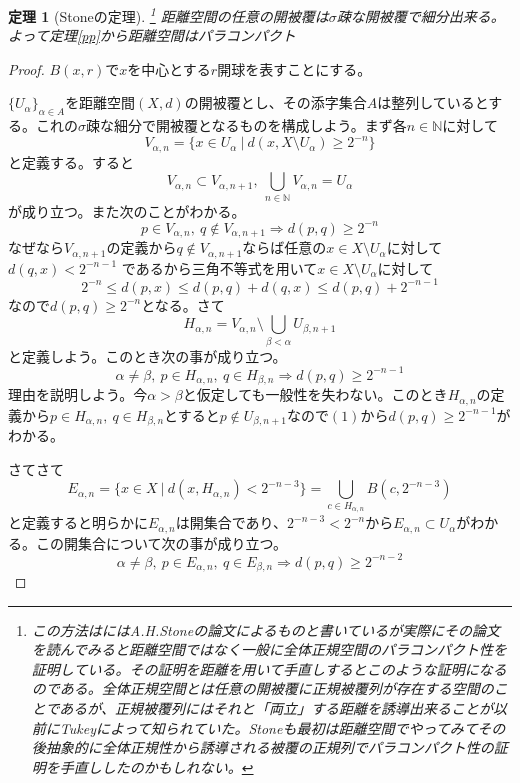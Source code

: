 \documentclass[leqno]{jsarticle}
\newtheorem{thm}{定理}
\newcommand{\To}{\Longrightarrow}
\newcommand{\nn}{\mathbb{N}}
\newcommand{\al}{\alpha}
\newcommand{\be}{\beta}
\begin{document}
\begin{thm}[Stoneの定理]\footnote{この方法は\cite{bi}にはA.H.Stoneの論文\cite{stone}によるものと書いているが実際にその論文を読んでみると距離空間ではなく一般に全体正規空間のパラコンパクト性を証明している。その証明を距離を用いて手直しするとこのような証明になるのである。全体正規空間とは任意の開被覆に正規被覆列が存在する空間のことであるが、正規被覆列にはそれと「両立」する距離を誘導出来ることが\cite{stone}以前にTukeyによって知られていた。Stoneも最初は距離空間でやってみてその後抽象的に全体正規性から誘導される被覆の正規列でパラコンパクト性の証明を手直ししたのかもしれない。}
距離空間の任意の開被覆は$\sigma$疎な開被覆で細分出来る。よって定理\ref{pp}から距離空間はパラコンパクト
\end{thm}
\begin{proof}$B(x,r)$で$x$を中心とする$r$開球を表すことにする。\par
$\{U_{\alpha}\}_{\alpha \in A}$を距離空間$(X,d)$の開被覆とし、その添字集合$A$は整列しているとする。これの$\sigma$疎な細分で開被覆となるものを構成しよう。まず各$n\in \nn$に対して
\[
V_{\al,n}=\{x\in U_{\al}\ |\ d(x,X\setminus U_{\al})\ge 2^{-n}\}
\]
と定義する。すると
\[
V_{\al,n}\subset V_{\al,n+1},\ \bigcup_{n\in \nn}V_{\al,n}=U_{\al}
\]
が成り立つ。また次のことがわかる。
\begin{equation}
p\in V_{\al,n},\ q\not\in V_{\al,n+1}\To d(p,q)\ge2^{-n}
\end{equation}
なぜなら$V_{\al,n+1}$の定義から$q\not\in V_{\al,n+1}$ならば任意の$x\in X\setminus U_{\al}$に対して$d(q,x)<2^{-n-1}$
であるから三角不等式を用いて$x\in X\setminus U_{\al}$に対して
\[
2^{-n}\le d(p,x)\le d(p,q)+d(q,x)\le d(p,q)+2^{-n-1}
\]
なので$d(p,q)\ge2^{-n}$となる。さて
\[
H_{\al,n}=V_{\al,n}\setminus\bigcup_{\be<\al}U_{\be,n+1}
\]
と定義しよう。このとき次の事が成り立つ。
\begin{equation}
\al\neq\be,\ p\in H_{\al,n},\ q\in H_{\be,n}\To d(p,q)\ge 2^{-n-1} 
\end{equation}
理由を説明しよう。今$\al>\be$と仮定しても一般性を失わない。このとき$H_{\al,n}$の定義から$p\in H_{\al,n},\ q\in H_{\be,n}$とすると$p\not\in U_{\be,n+1}$なので$(1)$から$d(p,q)\ge2^{-n-1}$がわかる。\par
さてさて
\[
E_{\al,n}=\{x\in X\ |\ d(x,H_{\al,n})<2^{-n-3}\}=\bigcup_{c\in H_{\al,n}}B(c,2^{-n-3})
\]
と定義すると明らかに$E_{\al,n}$は開集合であり、$2^{-n-3}<2^{-n}$から$E_{\al,n}\subset U_{\al}$がわかる。この開集合について次の事が成り立つ。
\begin{equation}
\al\neq\be,\ p\in E_{\al,n},\ q\in E_{\be,n}\To d(p,q)\ge 2^{-n-2} 

\end{equation}
\end{proof}
\end{document}
